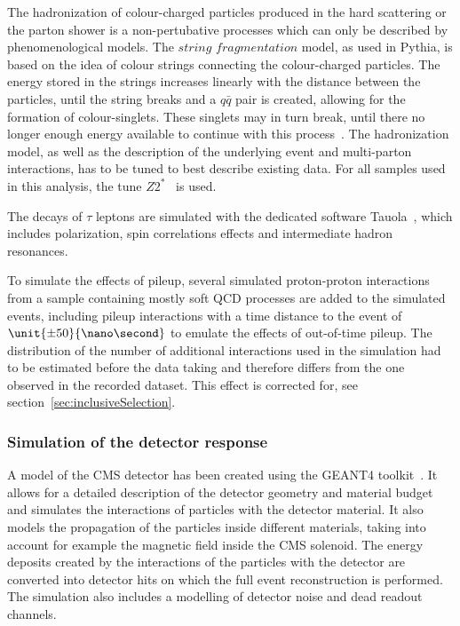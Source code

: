 The hadronization of colour-charged particles produced in the hard scattering or the parton shower is a non-pertubative processes which can only be described by phenomenological models. The $\textit{string fragmentation}$ model, as used in Pythia, is based on the idea of colour strings connecting the colour-charged particles. The energy stored in the strings increases linearly with the distance between the  particles, until the string breaks and a $q\bar{q}$ pair is created, allowing for the formation of colour-singlets. These singlets may in turn break, until there no longer enough energy available to continue with this process~\cite{Pythia}. The hadronization model, as well as the description of the underlying event and multi-parton interactions, has to be tuned to best describe existing data. For all samples used in this analysis, the tune $Z2^{*}$~\cite{Field:2011iq} is used. 

The decays of $\tau$ leptons are simulated with the dedicated software Tauola~\cite{Jadach1993361}, which includes polarization, spin correlations effects and intermediate hadron resonances. 

To simulate the effects of pileup, several simulated proton-proton interactions from a sample containing mostly soft QCD processes are added to the simulated events, including pileup interactions with a time distance to the event of $\unit{\pm50}{\nano\second}$ to emulate the effects of out-of-time pileup. The distribution of the number of additional interactions used in the simulation had to be estimated before the data taking and therefore differs from the one observed in the recorded dataset. This effect is corrected for, see section~\ref{sec:inclusiveSelection}.

\subsubsection{Simulation of the detector response}
A model of the CMS detector has been created using the GEANT4 toolkit~\cite{Agostinelli:2002hh}. It allows for a detailed description of the detector geometry and material budget and simulates the interactions of particles with the detector material. It also models the propagation of the particles inside different materials, taking into account for example the magnetic field inside the CMS solenoid. The energy deposits created by the interactions of the particles with the detector are converted into detector hits on which the full event reconstruction is performed. The simulation also includes a modelling of detector noise and dead readout channels.  

